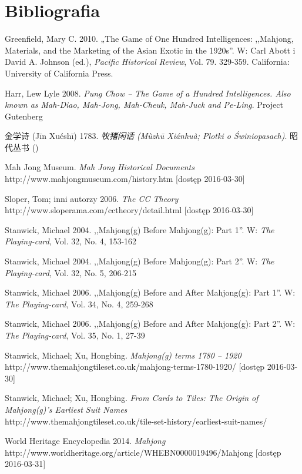 \onecolumn
\section*{Bibliografia}
Greenfield, Mary C. 2010. „The Game of One Hundred Intelligences: ,,Mahjong,
Materials, and the Marketing of the Asian Exotic in the 1920s''. W: Carl Abott i
David A. Johnson (ed.), \textit{Pacific Historical Review}, Vol. 79. 329-359.
California: University of California Press.

Harr, Lew Lyle 2008. \textit{Pung Chow -- The Game of a Hundred Intelligences.
Also known as Mah-Diao, Mah-Jong, Mah-Cheuk, Mah-Juck and Pe-Ling}. Project
Gutenberg

金学诗 (Jīn Xuéshī) 1783. \textit{牧猪闲话 (Mùzhū Xiánhuà; Plotki o Świniopasach)}.
昭代丛书 ()

Mah Jong Museum. \textit{Mah Jong Historical Documents}
http://www.mahjongmuseum.com/history.htm [dostęp
2016-03-30]

Sloper, Tom; inni autorzy 2006. \textit{The CC Theory}
\\http://www.sloperama.com/cctheory/detail.html [dostęp
2016-03-30]

Stanwick, Michael 2004. ,,Mahjong(g) Before Mahjong(g): Part 1''. W:
\textit{The Playing-card}, Vol. 32, No. 4, 153-162

Stanwick, Michael 2004. ,,Mahjong(g) Before Mahjong(g): Part 2''. W:
\textit{The Playing-card}, Vol. 32, No. 5, 206-215

Stanwick, Michael 2006. ,,Mahjong(g) Before and After Mahjong(g): Part 1''. W:
\textit{The Playing-card}, Vol. 34, No. 4, 259-268

Stanwick, Michael 2006. ,,Mahjong(g) Before and After Mahjong(g): Part 2''. W:
\textit{The Playing-card}, Vol. 35, No. 1, 27-39


Stanwick, Michael; Xu, Hongbing. \textit{Mahjong(g) terms 1780 – 1920}
\\http://www.themahjongtileset.co.uk/mahjong-terms-1780-1920/ [dostęp
2016-03-30]

Stanwick, Michael; Xu, Hongbing. \textit{From Cards to Tiles: The Origin of Mahjong(g)’s Earliest Suit Names}
\\http://www.themahjongtileset.co.uk/tile-set-history/earliest-suit-names/

World Heritage Encyclopedia 2014. \textit{Mahjong}
\\http://www.worldheritage.org/article/WHEBN0000019496/Mahjong [dostęp
2016-03-31]
